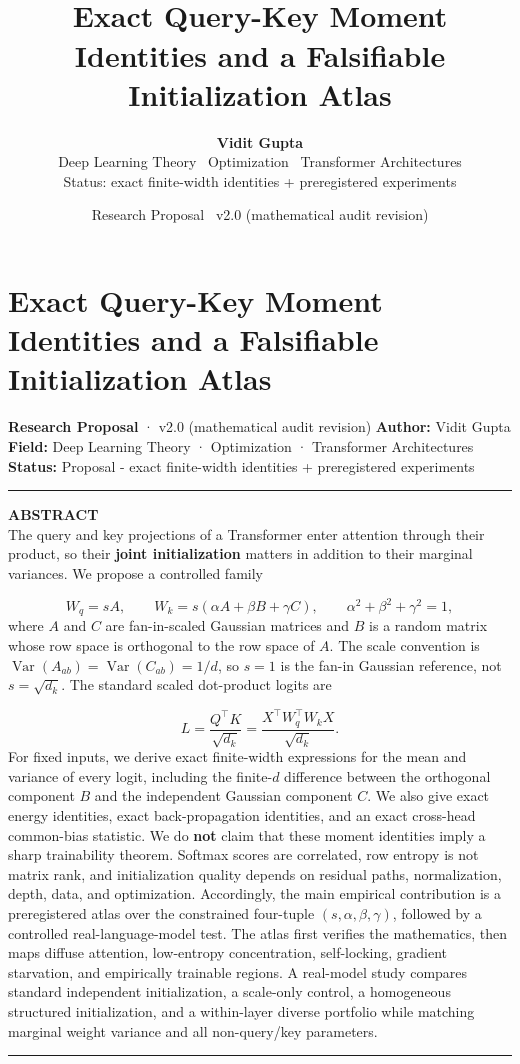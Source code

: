 \documentclass[11pt,letterpaper]{article}
\title{\vspace{-1.2em}{\color{navy}\bfseries The Geometry of Transformer Initialization}\\[0.35em]
{\large\color{soft} Exact Query-Key Moment Identities and a Falsifiable Initialization Atlas}}
\author{\textbf{Vidit Gupta}\\[0.2em]
{\small Deep Learning Theory \textbullet\ Optimization \textbullet\ Transformer Architectures}\\[0.15em]
{\small Status: exact finite-width identities + preregistered experiments}}
\date{Research Proposal \textbullet\ v2.0 (mathematical audit revision)}
\theoremstyle{definition}
\begin{document}
\maketitle
\vspace{-1.5em}
\section{Exact Query-Key Moment Identities and a Falsifiable Initialization Atlas}
\textbf{Research Proposal} · v2.0 (mathematical audit revision) \textbf{Author:} Vidit Gupta \textbf{Field:} Deep Learning Theory · Optimization · Transformer Architectures \textbf{Status:} Proposal - exact finite-width identities + preregistered experiments

\vspace{0.35em}\hrule\vspace{0.35em}
\begin{center}
\colorbox{absbg}{\parbox{0.96\textwidth}{\vspace{0.4em}
{\color{navy}\textbf{\small ABSTRACT}}\\[0.35em]
The query and key projections of a Transformer enter attention through their product, so their \textbf{joint initialization} matters in addition to their marginal variances. We propose a controlled family

\[
W_q=sA,\qquad W_k=s(\alpha A+\beta B+\gamma C),\qquad
\alpha^2+\beta^2+\gamma^2=1,
\]
where $A$ and $C$ are fan-in-scaled Gaussian matrices and $B$ is a random matrix whose row space is orthogonal to the row space of $A$. The scale convention is $\operatorname{Var}(A_{ab})=\operatorname{Var}(C_{ab})=1/d$, so $s=1$ is the fan-in Gaussian reference, not $s=\sqrt{d_k}$. The standard scaled dot-product logits are

\[
L=\frac{Q^\top K}{\sqrt{d_k}}
  =\frac{X^\top W_q^\top W_kX}{\sqrt{d_k}}.
\]
For fixed inputs, we derive exact finite-width expressions for the mean and variance of every logit, including the finite-$d$ difference between the orthogonal component $B$ and the independent Gaussian component $C$. We also give exact energy identities, exact back-propagation identities, and an exact cross-head common-bias statistic. We do \textbf{not} claim that these moment identities imply a sharp trainability theorem. Softmax scores are correlated, row entropy is not matrix rank, and initialization quality depends on residual paths, normalization, depth, data, and optimization. Accordingly, the main empirical contribution is a preregistered atlas over the constrained four-tuple $(s,\alpha,\beta,\gamma)$, followed by a controlled real-language-model test. The atlas first verifies the mathematics, then maps diffuse attention, low-entropy concentration, self-locking, gradient starvation, and empirically trainable regions. A real-model study compares standard independent initialization, a scale-only control, a homogeneous structured initialization, and a within-layer diverse portfolio while matching marginal weight variance and all non-query/key parameters.

\vspace{0.35em}\hrule\vspace{0.35em}
}}
\end{center}
\vspace{0.5em}
\end{document}
